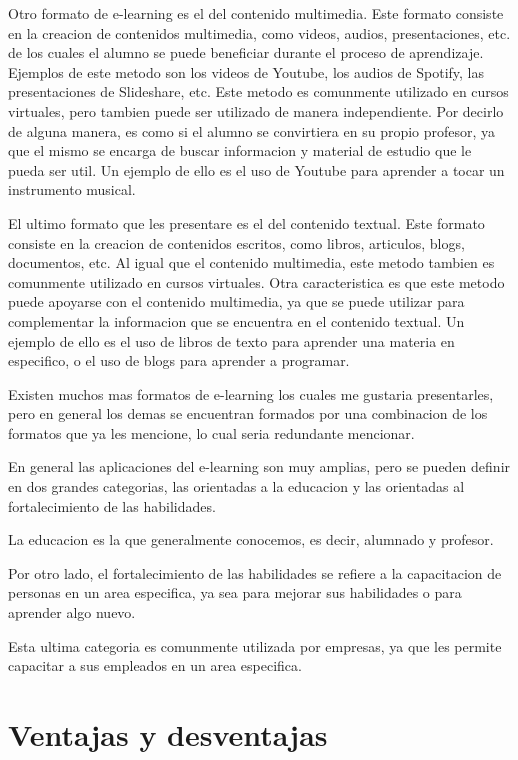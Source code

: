 Otro formato de e-learning es el del contenido multimedia. Este formato 
consiste en la creacion de contenidos multimedia, como videos, audios, 
presentaciones, etc. de los cuales el alumno se puede beneficiar durante el 
proceso de aprendizaje. Ejemplos de este metodo son los videos de Youtube,
los audios de Spotify, las presentaciones de Slideshare, etc. Este metodo 
es comunmente utilizado en cursos virtuales, pero tambien puede ser utilizado 
de manera independiente. Por decirlo de alguna manera, es como si el alumno 
se convirtiera en su propio profesor, ya que el mismo se encarga de buscar 
informacion y material de estudio que le pueda ser util. Un ejemplo de ello 
es el uso de Youtube para aprender a tocar un instrumento musical.

El ultimo formato que les presentare es el del contenido textual. Este 
formato consiste en la creacion de contenidos escritos, como libros, 
articulos, blogs, documentos, etc. Al igual que el contenido multimedia, este 
metodo tambien es comunmente utilizado en cursos virtuales. Otra caracteristica 
es que este metodo puede apoyarse con el contenido multimedia, ya que se 
puede utilizar para complementar la informacion que se encuentra en el 
contenido textual. Un ejemplo de ello es el uso de libros de texto para 
aprender una materia en especifico, o el uso de blogs para aprender a 
programar.

Existen muchos mas formatos de e-learning los cuales me gustaria presentarles,
pero en general los demas se encuentran formados por una combinacion de los 
formatos que ya les mencione, lo cual seria redundante mencionar.

En general las aplicaciones del e-learning son muy amplias, pero se pueden 
definir en dos grandes categorias, las orientadas a la educacion y las 
orientadas al fortalecimiento de las habilidades.

La educacion es la que generalmente conocemos, es decir, alumnado y profesor.

Por otro lado, el fortalecimiento de las habilidades se refiere a la 
capacitacion de personas en un area especifica, ya sea para mejorar sus 
habilidades o para aprender algo nuevo.

Esta ultima categoria es comunmente utilizada por empresas, ya que les
permite capacitar a sus empleados en un area especifica.

\section{Ventajas y desventajas}

